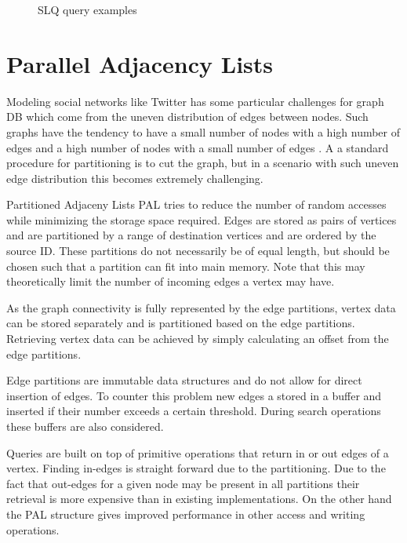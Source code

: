 \documentclass{sig-alternate}
\begin{document}
\begin{figure}[H]
\centering
{}
\caption{SLQ query examples \cite{yang2014schemaless}}
\label{fig:slqexample }
\end{figure}

\section{Parallel Adjacency Lists}
Modeling social networks like Twitter has some particular challenges
for graph DB which come from the uneven distribution of edges between nodes.
Such graphs have the tendency to have a small number of nodes with a high number of edges
and a high number of nodes with a small number of edges \cite{gonzalez2012powergraph}.
A a standard procedure for partitioning is to cut the graph, but in 
a scenario with such uneven edge distribution this becomes extremely challenging.

Partitioned Adjaceny Lists PAL \cite{kyrola2014graphchi} tries to reduce the number of random accesses while minimizing the storage
space required. Edges are stored as pairs of vertices and are partitioned by a range of destination
vertices and are ordered by the source ID. These partitions do not necessarily be of equal length, but should 
be chosen such that a partition can fit into main memory. Note that this may theoretically limit the number of
incoming edges a vertex may have.

As the graph connectivity is fully represented 
by the edge partitions, vertex data can be stored separately and is partitioned 
based on the edge partitions. Retrieving vertex data can be achieved by simply calculating an offset from
the edge partitions.

Edge partitions are immutable data structures and do not allow for direct insertion of edges. 
To counter this problem new edges a stored in a buffer and inserted if their number exceeds a certain threshold.
During search operations these buffers are also considered.

Queries are built on top of primitive operations that return in or out edges of a vertex.
Finding in-edges is straight forward due to the partitioning. Due to the fact that out-edges
for a given node may be present in all partitions their retrieval is more expensive than
in existing implementations. On the other hand the PAL structure gives improved performance in other access and writing operations.
\end{document}
